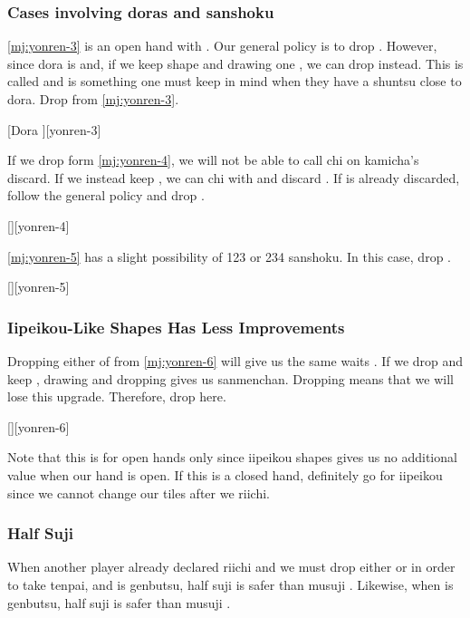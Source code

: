 \documentclass[12pt]{article}
\begin{document}
\subsubsection*{Cases involving doras and sanshoku}

\ref{mj:yonren-3} is an open hand with . Our general policy is to drop . However, since dora is  and, if we keep  shape and drawing one , we can drop  instead. This is called  and is something one must keep in mind when they have a shuntsu close to dora. Drop  from \ref{mj:yonren-3}.

[Dora ][yonren-3]

If we drop  form \ref{mj:yonren-4}, we will not be able to call chi on kamicha's  discard. If we instead keep , we can chi  with  and discard . If  is already discarded, follow the general policy and drop .

[][yonren-4]

\ref{mj:yonren-5} has a slight possibility of 123 or 234 sanshoku. In this case, drop .

[][yonren-5]


\subsubsection*{Iipeikou-Like Shapes Has Less Improvements}

Dropping either of  from \ref{mj:yonren-6} will give us the same waits . If we drop  and keep , drawing  and dropping  gives us  sanmenchan. Dropping  means that we will lose this upgrade. Therefore, drop  here.

[][yonren-6]

Note that this is for open hands only since iipeikou shapes gives us no additional value when our hand is open. If this is a closed hand, definitely go for iipeikou since we cannot change our tiles after we riichi.


\subsubsection*{Half Suji}

When another player already declared riichi and we must drop either  or  in order to take tenpai, and  is genbutsu, half suji  is safer than musuji  \citep[][pp.~140--141]{miinin-stat}. Likewise, when  is genbutsu, half suji  is safer than musuji .
\end{document}
